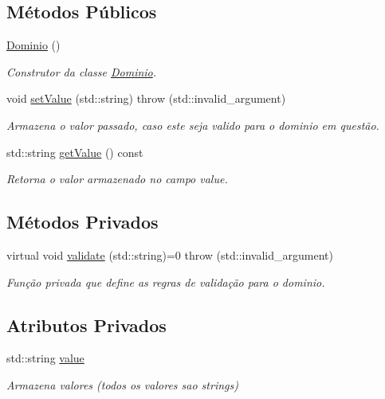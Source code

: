 \subsection*{Métodos Públicos}
\begin{DoxyCompactItemize}
\item 
\hyperlink{classshibarides_1_1Dominio_ab421ab3e3bcca7f47fe5320e0957b9a9}{Dominio} ()
\begin{DoxyCompactList}\small\item\em Construtor da classe \hyperlink{classshibarides_1_1Dominio}{Dominio}. \end{DoxyCompactList}\item 
void \hyperlink{classshibarides_1_1Dominio_a459a792e3f90b5b83880d3277c15747c}{set\+Value} (std\+::string)  throw (std\+::invalid\+\_\+argument)
\begin{DoxyCompactList}\small\item\em Armazena o valor passado, caso este seja valido para o dominio em questão. \end{DoxyCompactList}\item 
std\+::string \hyperlink{classshibarides_1_1Dominio_aa6fca113add7ee85dee788f4325fe564}{get\+Value} () const 
\begin{DoxyCompactList}\small\item\em Retorna o valor armazenado no campo value. \end{DoxyCompactList}\end{DoxyCompactItemize}
\subsection*{Métodos Privados}
\begin{DoxyCompactItemize}
\item 
virtual void \hyperlink{classshibarides_1_1Dominio_acc9445531455c072bbf708709aebbe55}{validate} (std\+::string)=0  throw (std\+::invalid\+\_\+argument)
\begin{DoxyCompactList}\small\item\em Função privada que define as regras de validação para o dominio. \end{DoxyCompactList}\end{DoxyCompactItemize}
\subsection*{Atributos Privados}
\begin{DoxyCompactItemize}
\item 
std\+::string \hyperlink{classshibarides_1_1Dominio_a840b839896c84528573c299496033dcc}{value}\hypertarget{classshibarides_1_1Dominio_a840b839896c84528573c299496033dcc}{}\label{classshibarides_1_1Dominio_a840b839896c84528573c299496033dcc}

\begin{DoxyCompactList}\small\item\em Armazena valores (todos os valores sao strings) \end{DoxyCompactList}\end{DoxyCompactItemize}


